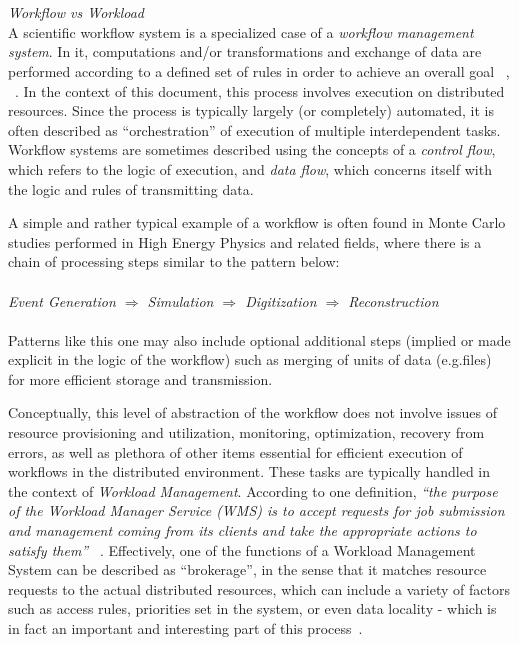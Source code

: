 \\
\\
\textit{Workflow vs Workload}
\\
A scientific workflow system is a specialized case of a \textit{workflow management system}. In it, computations and/or transformations and exchange of data are performed according to a defined set of rules in order to achieve an overall goal ~\cite{grid_workflow_taxonomy}, ~\cite{grid_workflow_fit}. In the context of this document, this process involves execution on distributed resources. Since the process is typically largely (or completely) automated, it is often described as ``orchestration'' of execution of multiple interdependent tasks. Workflow systems are sometimes described using the concepts of a \textit{control flow}, which refers to the logic of execution, and \textit{data flow}, which concerns itself with the logic and rules of transmitting data.

A simple and rather typical example of a workflow is often found in Monte Carlo studies performed in High Energy Physics and related fields, where there is a chain of processing steps similar to the pattern below:
\\
\\
\textit{Event  Generation $\Longrightarrow$ Simulation $\Longrightarrow$ Digitization $\Longrightarrow$ Reconstruction}
\\
\\
Patterns like this one may also include optional additional steps (implied or made explicit in the logic of the workflow) such as merging of units of data (e.g.files) for more efficient storage and transmission.

Conceptually, this level of abstraction of the workflow does not  involve issues of resource provisioning and utilization, monitoring, optimization, recovery from errors, as well as plethora of other items essential
for efficient execution of workflows in the distributed environment. These tasks are typically handled in the context of \textit{Workload Management}. According to one definition, \textit{``the purpose of the Workload Manager Service (WMS) is to accept requests for job submission and
management coming from its clients and take the appropriate actions to satisfy them''} ~\cite{egee_user_guide}. Effectively, one of the functions of a Workload Management System can be described as ``brokerage'', in the sense that it matches resource requests to the actual distributed resources, which can include a variety of factors such as access rules, priorities set in the system, or even data locality - which is in fact an important and interesting part of this process~\cite{panda_chep11}.

